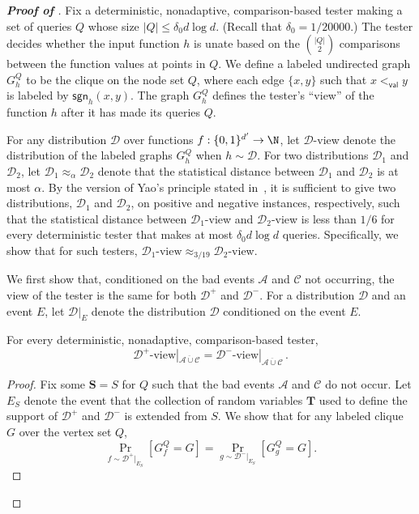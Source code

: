 \documentclass{toc}
\newcommand{\bS}{\ensuremath{\mathbf{S}}}
\newcommand{\bT}{\ensuremath{\mathbf{T}}}
\newcommand{\cA}{\ensuremath{\mathcal{A}}}
\newcommand{\cC}{\ensuremath{\mathcal{C}}}
\newcommand{\cD}{\ensuremath{\mathcal{D}}}
\newcommand{\hypercube}{\ensuremath{\{0,1\}^\dd}}
\newcommand{\Yes}{\ensuremath{\mathcal{D}^+}}
\newcommand{\No}{\ensuremath{\mathcal{D}^-}}
\newcommand{\lbconst}{\ensuremath{\delta_0}}
\newcommand{\order}{\ensuremath{<_\dec}}
\newcommand{\goodS}{\ensuremath{E_S}}
\newcommand{\dd}{\ensuremath{{d'}}}
\newcommand{\dec}{\mathsf{val}}
\newcommand{\sgn}{\mathsf{sgn}}
\newcommand{\Thm}[1]{\expref{Theorem}{thm:#1}}
\begin{document}
\begin{proof}[{\bf Proof of \Thm{non-adap-lb}}]
Fix a deterministic, nonadaptive, comparison-based tester making a set of queries $Q$ whose size $|Q| \leq \lbconst d \log d$. (Recall that $\lbconst = {1}/{20000}$.)
The tester decides whether the input function $h$ is unate
based on the $\binom{|Q|}{2}$ comparisons between the function values at points in $Q$.
We define a labeled undirected graph $G^Q_h$ to be the clique on the node set $Q$, where each edge $\{x,y\}$ such that $x \order y$ is labeled by $\sgn_h(x,y)$.
The graph $G^Q_h$ defines the tester's ``view'' of the function $h$ after it has made its queries $Q$.

For any distribution $\cD$ over functions $f:\hypercube \to \N$, let $\cD$-view denote the distribution of the labeled graphs $G^Q_h$ when $h \sim \cD$.
For two distributions $\mathcal{D}_1$ and $\mathcal{D}_2$, let $\mathcal{D}_1 \approx_{\alpha} \mathcal{D}_2$ denote that the statistical distance between
$\mathcal{D}_1$ and $\mathcal{D}_2$ is at most $\alpha$.
By the version of Yao's principle stated in~\cite[Claim~5]{RS06},
it is sufficient to give two distributions, $\cD_1$ and $\cD_2$, 
on
%
%
positive and
%
%
negative instances, respectively, %
such that
the statistical distance between $\cD_1$-view and $\cD_2$-view is less than $1/6$
%
for every deterministic tester that makes at most $\lbconst d \log d$ queries.
Specifically, we show that for such testers, $\cD_1\text{-view} \approx_{3/19} \cD_2$-view.

We first show that, conditioned on the bad events $\cA$ and $\cC$ not occurring, the view of the tester is the same for both $\Yes$ and $\No$.
For a distribution $\cD$ and an event $E$, let $\cD|_{E}$ denote the distribution $\cD$ conditioned on the event $E$.

%
%
%
%
%

\begin{lemma}\label{lem:zero}
For every deterministic, nonadaptive, comparison-based tester,
\[\Yes\text{-view}|_{\overline{\cA \cup \cC}} = \No\text{-view}|_{\overline{\cA \cup \cC}}\,.\]  %
\end{lemma}
\begin{proof}
Fix some $\bS = S$ for $Q$ such that the bad events $\cA$ and $\cC$ do not occur. Let $\goodS$ denote the event that the collection of random variables $\bT$ used to define the support of $\Yes$ and $\No$ is extended from $S$.
We show that for any labeled clique $G$ over the vertex set $Q$,
\[\Pr_{f\sim \Yes|_{\goodS}} [G^Q_f = G] = \Pr_{g\sim \No|_{\goodS}} [G^Q_g = G].\]


\end{proof}
\end{proof}
\end{document}
